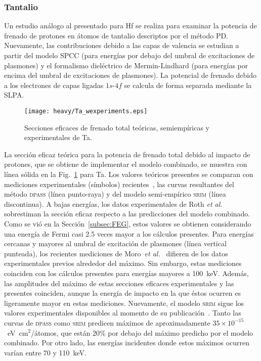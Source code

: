 \subsubsection{Tantalio}
\label{subsec:tantalio}

Un estudio análogo al presentado para Hf se realiza para examinar la 
potencia de frenado de protones en átomos de tantalio descriptos por el 
método PD. Nuevamente, las contribuciones debido a las capas de valencia 
se estudian a partir del modelo SPCC (para energías por debajo del 
umbral de excitaciones de plasmones) y el formalismo dieléctrico de 
Mermin-Lindhard (para energías por encima del umbral de excitaciones de 
plasmones). La potencial de frenado debido a los electrones de capas 
ligadas $1s$-$4f$ se calcula de forma separada mediante la SLPA.

\begin{figure}[t]
\centering
\texttt{[image: heavy/Ta\_wexperiments.eps]}
\caption[Secciones eficaces teóricas, semiempíricas y experimentales de 
Ta.]
{Secciones eficaces de frenado total teóricas, semiempíricas y
experimentales de Ta.}
\label{fig:Ta_SP}
\end{figure}

La sección eficaz teórica para la potencia de frenado total debido al 
impacto de protones, que se obtiene de implementar el modelo combinado, 
se muestra con línea sólida en la Fig.~\ref{fig:Ta_SP} para Ta. Los 
valores teóricos presentes se comparan con mediciones experimentales 
(símbolos) recientes~\cite{Moro:20,Roth:17,iaea,Shiomi:96,Shiomi:94,
Bichsel:92,Ogino:88,Sirotinin:84,Krist:83}, las curvas resultantes del 
método \textsc{dpass} (línea punto-raya) y del modelo semi-empírico 
\textsc{srim} (línea discontinua). A bajas energías, los datos 
experimentales de Roth \textit{et al.}~\cite{Roth:17} sobrestiman la 
sección eficaz respecto a las predicciones del modelo combinado. Como se 
vió en la 
Sección~\ref{subsec:FEG}, estos valores se obtienen considerando una 
energía de Fermi casi 2.5 veces mayor a los cálculos presentes. Para 
energías cercanas y mayores al umbral de excitación de plasmones (línea 
vertical punteada), los recientes mediciones de 
Moro~\textit{et al.}~\cite{Moro:20} difieren de los datos experimentales 
previos alrededor del máximo. Sin embargo, estas mediciones coinciden 
con los cálculos presentes para energías mayores a 100~keV. Además, las 
amplitudes del máximo de estas secciones 
eficaces experimentales y las presentes coinciden, aunque la energía de 
impacto en la que éstos ocurren es ligeramente mayor en estas mediciones. 
Nuevamente, el modelo \textsc{srim} sigue los valores experimentales 
disponibles al momento de su publicación~\cite{iaea}. Tanto las curvas 
de \textsc{dpass} como \textsc{srim} predicen máximos de aproximadamente 
$35\times 10^{-15}$~eV~cm$^2$/átomos, que están 20\% por debajo del 
máximo predicho por el modelo combinado. Por otro lado, las energías 
incidentes donde estos máximos ocurren varían entre 70 y 110~keV. 


